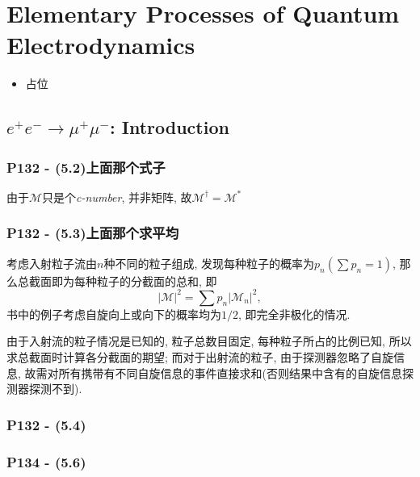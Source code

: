 \chapter{Elementary Processes of Quantum Electrodynamics}

\begin{itemize}
  \item 占位
\end{itemize}

\pagestyle{general}

\section{\texorpdfstring{$e^+e^- \rightarrow \mu^+\mu^-$}:: Introduction}

\subsection{P132 - (5.2)上面那个式子}

由于$\mathcal{M}$只是个\textit{c-number}, 并非矩阵, 故$\mathcal{M}^\dagger = \mathcal{M}^*$

\subsection{P132 - (5.3)上面那个求平均}

考虑入射粒子流由$n$种不同的粒子组成, 发现每种粒子的概率为$p_n(\sum p_n = 1)$, 那么总截面即为每种粒子的分截面的总和, 即
\begin{equation}
  |\mathcal{M}|^2 = \sum p_n |\mathcal{M}_n|^2,
\end{equation}
书中的例子考虑自旋向上或向下的概率均为$1/2$, 即完全非极化的情况.

由于入射流的粒子情况是已知的, 粒子总数目固定, 每种粒子所占的比例已知, 所以求总截面时计算各分截面的期望; 而对于出射流的粒子, 由于探测器忽略了自旋信息, 故需对所有携带有不同自旋信息的事件直接求和(否则结果中含有的自旋信息探测器探测不到).

\subsection{P132 - (5.4)}

\subsection{P134 - (5.6)}

